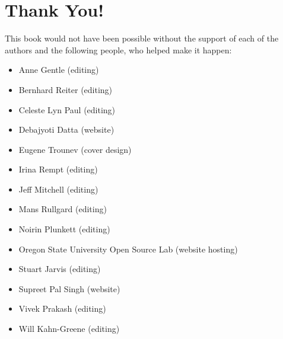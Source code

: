 \section*{Thank You!}

This book would not have been possible without the support of each of the
authors and the following people, who helped make it happen:
\begin{itemize}
 \item Anne Gentle (editing)
 \item Bernhard Reiter (editing)
 \item Celeste Lyn Paul (editing)
 \item Debajyoti Datta (website)
 \item Eugene Trounev (cover design)
 \item Irina Rempt (editing)
 \item Jeff Mitchell (editing)
 \item Mans Rullgard (editing)
 \item Noirin Plunkett (editing)
 \item Oregon State University Open Source Lab (website hosting)
 \item Stuart Jarvis (editing)
 \item Supreet Pal Singh (website)
 \item Vivek Prakash (editing)
 \item Will Kahn-Greene (editing)
\end{itemize}

\newpage
